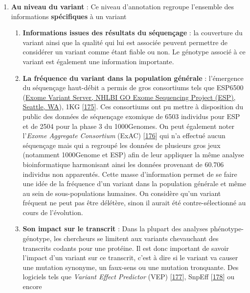 \documentclass[12pt,a4paper,twoside]{ugathesis}
\providecommand{\tightlist}{%
  \setlength{\itemsep}{0pt}\setlength{\parskip}{0pt}}
\theoremstyle{definition}
\theoremstyle{definition}
\theoremstyle{definition}
\theoremstyle{remark}
\begin{document}
\begin{enumerate}
\def\labelenumi{\arabic{enumi}.}
\tightlist
\item
  \textbf{Au niveau du variant} : Ce niveau d'annotation regroupe
  l'ensemble des informations \textbf{spécifiques} à un variant

  \begin{enumerate}
  \def\labelenumii{\alph{enumii}.}
  \item
    \textbf{Informations issues des résultats du séquençage} : la
    couverture du variant ainsi que la qualité qui lui est associée
    peuvent permettre de considérer un variant comme étant fiable ou
    non. Le génotype associé à ce variant est également une information
    importante.
  \item
    \textbf{La fréquence du variant dans la population générale} :
    l'émergence du séquençage haut-débit a permis de gros consortiums
    tels que ESP6500 (\href{http://evs.gs.washington.edu/EVS/}{Exome
    Variant Server, NHLBI GO Exome Sequencing Project (ESP), Seattle,
    WA}), 1KG
    {[}\protect\hyperlink{ref-1000GenomesProjectConsortium2015}{175}{]}.
    Ces consortiums ont pu mettre à disposition du public des données de
    séquençage exomique de 6503 individus pour ESP et de 2504 pour la
    phase 3 du 1000Genomes. On peut également noter l'\emph{Exome
    Aggregate Consortium} (ExAC)
    {[}\protect\hyperlink{ref-Lek2016}{176}{]} qui n'a effectué aucun
    séquençage mais qui a regroupé les données de plusieurs gros jeux
    (notamment 1000Genome et ESP) afin de leur appliquer la même analyse
    bioinformatique harmonisant ainsi les données provenant de 60.706
    individus non apparentés. Cette masse d'information permet de se
    faire une idée de la fréquence d'un variant dans la population
    générale et même au sein de sous-populations humaines. On considère
    qu'un variant fréquent ne peut pas être délétère, sinon il aurait
    été contre-sélectionné au cours de l'évolution.
  \item
    \textbf{Son impact sur le transcrit} : Dans la plupart des analyses
    phénotype-génotype, les chercheurs se limitent aux variants
    chevauchant des transcrits codants pour une protéine. Il est donc
    important de savoir l'impact d'un variant sur ce transcrit, c'est à
    dire si le variant va causer une mutation synonyme, un faux-sens ou
    une mutation tronquante. Des logiciels tels que \emph{Variant Effect
    Predictor} (VEP) {[}\protect\hyperlink{ref-McLaren2016}{177}{]},
    SnpEff {[}\protect\hyperlink{ref-Cingolani2012}{178}{]} ou encore

\end{enumerate}
\end{enumerate}
\end{document}
